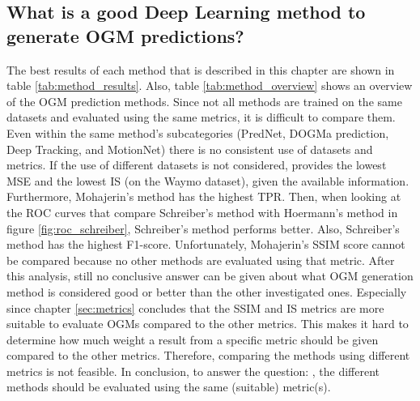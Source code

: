 \subsection{What is a good Deep Learning method to generate \gls{OGM} predictions?} \label{subsec:con_method}
The best results of each method that is described in this chapter are shown in table \ref{tab:method_results}. Also, table \ref{tab:method_overview} shows an overview of the \gls{OGM} prediction methods. Since not all methods are trained on the same datasets and evaluated using the same metrics, it is difficult to compare them. Even within the same method's subcategories (PredNet, \gls{DOGMa} prediction, Deep Tracking, and MotionNet) there is no consistent use of datasets and metrics. If the use of different datasets is not considered, \cite{lange2020attention} provides the lowest \gls{MSE} and the lowest \gls{IS} (on the Waymo \cite{sun2020scalability} dataset), given the available information. Furthermore, Mohajerin's \cite{mohajerin2019multi} method has the highest \gls{TPR}. Then, when looking at the \gls{ROC} curves that compare Schreiber's method \cite{schreiber2019long} with Hoermann's method \cite{hoermann2018dynamic} in figure \ref{fig:roc_schreiber}, Schreiber's method \cite{schreiber2019long} performs better. Also, Schreiber's method \cite{schreiber2019long} has the highest F1-score. Unfortunately, Mohajerin's \cite{mohajerin2019multi} \gls{SSIM} score cannot be compared because no other methods are evaluated using that metric. After this analysis, still no conclusive answer can be given about what \gls{OGM} generation method is considered good or better than the other investigated ones. Especially since chapter \ref{sec:metrics} concludes that the \gls{SSIM} and \gls{IS} metrics are more suitable to evaluate \glspl{OGM} compared to the other metrics. This makes it hard to determine how much weight a result from a specific metric should be given compared to the other metrics. Therefore, comparing the methods using different metrics is not feasible. In conclusion, to answer the question: , the different methods should be evaluated using the same (suitable) metric(s). 

